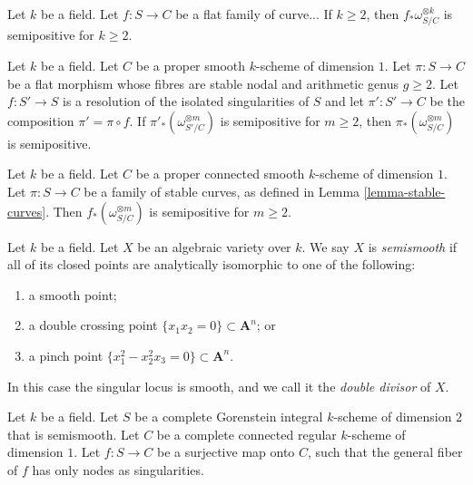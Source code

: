 \begin{lemma}
Let $k$ be a field.
Let $f : S \to C$ be a flat family of curve...
If $k \geq 2$, then $f_*\omega_{S/C}^{\otimes k}$ is semipositive for $k \geq 2$.
\end{lemma}

\begin{lemma}
\label{lemma-stable-curves-semipositive-resolve}
Let $k$ be a field.
Let $C$ be a proper smooth $k$-scheme of dimension $1$.
Let $\pi : S \to C$ be a flat morphism whose fibres are stable nodal and arithmetic
genus $g \geq 2$.
Let $f : S' \to S$ is a resolution of the isolated singularities of $S$
and let $\pi' : S' \to C$ be the composition $\pi' = \pi \circ f$.
If $\pi'_*(\omega_{S'/C}^{\otimes m})$ is semipositive for $m \geq 2$, then
$\pi_*(\omega_{S/C}^{\otimes m})$ is semipositive.
\end{lemma}

\begin{lemma}[cf.\ {\cite[Theorem 4.3]{Ko90}}]
\label{lemma-stable-curves-semipositive}
Let $k$ be a field.
Let $C$ be a proper connected smooth $k$-scheme of dimension $1$.
Let $\pi : S \to C$ be a family of stable curves,
as defined in Lemma \ref{lemma-stable-curves}.
Then $f_*(\omega_{S/C}^{\otimes m})$ is semipositive for $m \geq 2$.
\end{lemma}

\begin{definition}[cf.\ {\cite[Definition 4.1(i)]{Ko90}}]
\label{definition-semismooth}
Let $k$ be a field.
Let $X$ be an algebraic variety over $k$.
We say $X$ is {\it semismooth} if all of its closed points are analytically
isomorphic to one of the following:
\begin{enumerate}
\item a smooth point;
\item a double crossing point $\{x_1x_2 = 0\} \subset \mathbf{A}^n$; or
\item a pinch point $\{x_1^2 - x_2^2x_3 = 0\} \subset \mathbf{A}^n$.
\end{enumerate}
In this case the singular locus is smooth, and we call it the {\it double
divisor} of $X$.
\end{definition}

\begin{situation}
\label{situation-kollar-theorem-4.3}
Let $k$ be a field.
Let $S$ be a complete Gorenstein integral $k$-scheme of dimension $2$ that is
semismooth.
Let $C$ be a complete connected regular $k$-scheme of dimension $1$.
Let $f : S \to C$ be a surjective map onto $C$, such that the general fiber of
$f$ has only nodes as singularities.
\end{situation}

